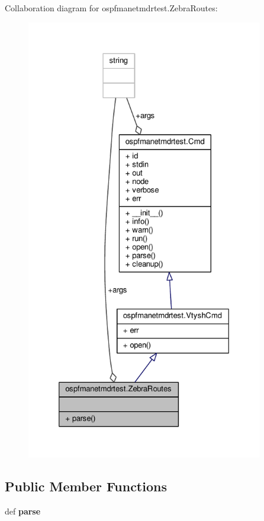 Collaboration diagram for ospfmanetmdrtest.\+Zebra\+Routes\+:
\nopagebreak
\begin{figure}[H]
\begin{center}
\leavevmode
\includegraphics[height=550pt]{classospfmanetmdrtest_1_1_zebra_routes__coll__graph}
\end{center}
\end{figure}
\subsection*{Public Member Functions}
\begin{DoxyCompactItemize}
\item 
\hypertarget{classospfmanetmdrtest_1_1_zebra_routes_a5990eb74bd82eeedcb43acee072f8ea0}{def {\bfseries parse}}\label{classospfmanetmdrtest_1_1_zebra_routes_a5990eb74bd82eeedcb43acee072f8ea0}

\end{DoxyCompactItemize}
